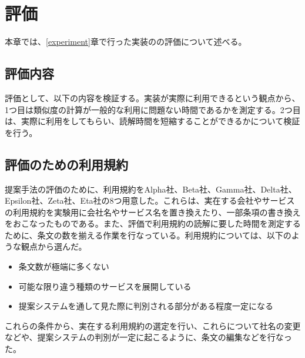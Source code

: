 \chapter{評価}
\label{discussion}
本章では、\ref{experiment}章で行った実装のの評価について述べる。

\section{評価内容}
評価として、以下の内容を検証する。実装が実際に利用できるという観点から、1つ目は類似度の計算が一般的な利用に問題ない時間であるかを測定する。2つ目は、実際に利用をしてもらい、読解時間を短縮することができるかについて検証を行う。

\section{評価のための利用規約}
\label{sec:評価のための利用規約}
提案手法の評価のために、利用規約をAlpha社、Beta社、Gamma社、Delta社、Epsilon社、Zeta社、Eta社の8つ用意した。これらは、実在する会社やサービスの利用規約を実験用に会社名やサービス名を置き換えたり、一部条項の書き換えをおこなったものである。また、評価で利用規約の読解に要した時間を測定するために、条文の数を揃える作業を行なっている。利用規約については、以下のような観点から選んだ。
\begin{itemize}
  \item 条文数が極端に多くない
  \item 可能な限り違う種類のサービスを展開している
  \item 提案システムを通して見た際に判別される部分がある程度一定になる
\end{itemize}
これらの条件から、実在する利用規約の選定を行い、これらについて社名の変更などや、提案システムの判別が一定に起こるように、条文の編集などを行なった。

